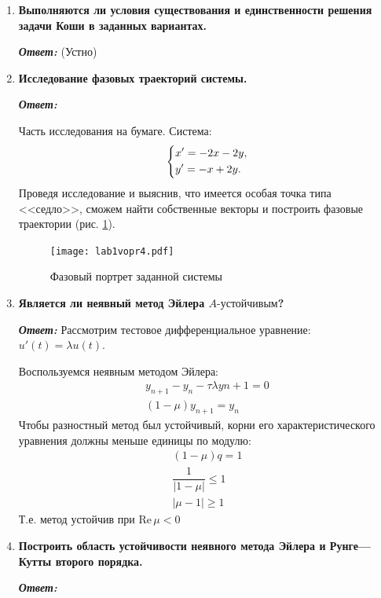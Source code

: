 \documentclass[12pt, a4paper]{article}
\begin{document}
\begin{enumerate}
		\item \textbf{Выполняются ли условия существования и единственности решения задачи Коши в заданных вариантах.}
		\vspace*{0.2cm} 
		
		\textit{\textbf{Ответ:}} 
		(Устно)
		
		\item \textbf{Исследование фазовых траекторий системы.}
		\vspace*{0.2cm} 
		
		\textit{\textbf{Ответ:}} 
		
		Часть исследования на бумаге. Система:
		\[
		\begin{dcases}
			x' = -2x -2y,\\
			y' = -x + 2y.
		\end{dcases}
		\]
		Проведя исследование и выяснив, что имеется особая точка типа <<седло>>, сможем найти собственные векторы и построить фазовые траектории (рис. \ref{hitler.}).
		\begin{figure}[H]
			\centering
			\texttt{[image: lab1vopr4.pdf]}
			\caption{Фазовый портрет заданной системы}
			\label{hitler.}
		\end{figure}
		
		\item \textbf{Является ли неявный метод Эйлера $A\text{-устойчивым}$?}
		\vspace*{0.2cm} 
		
		\textit{\textbf{Ответ:}} 
		Рассмотрим тестовое дифференциальное уравнение: $u'(t) = \lambda u(t)$.
		
		Воспользуемся неявным методом Эйлера:
		\begin{gather*}
		y_{n+1} - y_{n} - \tau \lambda y{n+1} = 0 \\
		(1-\mu) y_{n+1}  = y_{n}
		\end{gather*}
		Чтобы разностный метод был устойчивый, корни его характеристического уравнения должны меньше единицы по модулю:
		\begin{gather*}
			(1-\mu) q  = 1 \\
			\dfrac{1}{|1-\mu|} \le 1 \\
			|\mu - 1| \ge 1
		\end{gather*}
		Т.е. метод устойчив при $\text{Re} \, \mu < 0$

	\item \textbf{Построить область устойчивости неявного метода Эйлера и Рунге---Кутты второго порядка.}
	
	\textit{\textbf{Ответ:}}


\end{enumerate}
\end{document}
